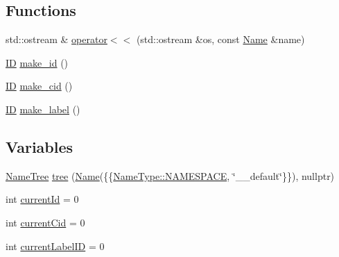 \subsection*{Functions}
\begin{DoxyCompactItemize}
\item 
std\+::ostream \& \mbox{\hyperlink{namespace_erable_1_1_compiler_1_1_a_s_t_a2468c85695ecb089e08a6568da2b9e12}{operator$<$$<$}} (std\+::ostream \&os, const \mbox{\hyperlink{class_erable_1_1_compiler_1_1_a_s_t_1_1_name}{Name}} \&name)
\item 
\mbox{\hyperlink{struct_erable_1_1_compiler_1_1_a_s_t_1_1_i_d}{ID}} \mbox{\hyperlink{namespace_erable_1_1_compiler_1_1_a_s_t_a7790575979d6ca1f532411a34a179746}{make\+\_\+id}} ()
\item 
\mbox{\hyperlink{struct_erable_1_1_compiler_1_1_a_s_t_1_1_i_d}{ID}} \mbox{\hyperlink{namespace_erable_1_1_compiler_1_1_a_s_t_ae083e7b298be9dda627723fe87519165}{make\+\_\+cid}} ()
\item 
\mbox{\hyperlink{struct_erable_1_1_compiler_1_1_a_s_t_1_1_i_d}{ID}} \mbox{\hyperlink{namespace_erable_1_1_compiler_1_1_a_s_t_a3ad5e62c30381df13fcc0c9c01674fb5}{make\+\_\+label}} ()
\end{DoxyCompactItemize}
\subsection*{Variables}
\begin{DoxyCompactItemize}
\item 
\mbox{\hyperlink{class_erable_1_1_compiler_1_1_a_s_t_1_1_name_tree}{Name\+Tree}} \mbox{\hyperlink{namespace_erable_1_1_compiler_1_1_a_s_t_a88afc6fd33b444e170c4ede257ce1b5d}{tree}} (\mbox{\hyperlink{class_erable_1_1_compiler_1_1_a_s_t_1_1_name}{Name}}(\{\{\mbox{\hyperlink{namespace_erable_1_1_compiler_1_1_a_s_t_a9359137137aacfee07e935a0ae706a84a7347fe5a0f184f79ef064e92e3beb297}{Name\+Type\+::\+N\+A\+M\+E\+S\+P\+A\+CE}}, \char`\"{}\+\_\+\+\_\+default\char`\"{}\}\}), nullptr)
\item 
int \mbox{\hyperlink{namespace_erable_1_1_compiler_1_1_a_s_t_a90f769e820ff02d1a91347fb301f6435}{current\+Id}} = 0
\item 
int \mbox{\hyperlink{namespace_erable_1_1_compiler_1_1_a_s_t_a439bd54b537bf235422ff923039bac60}{current\+Cid}} = 0
\item 
int \mbox{\hyperlink{namespace_erable_1_1_compiler_1_1_a_s_t_ad5d7d4540a5f5eef77dfd6056081eec6}{current\+Label\+ID}} = 0
\end{DoxyCompactItemize}


